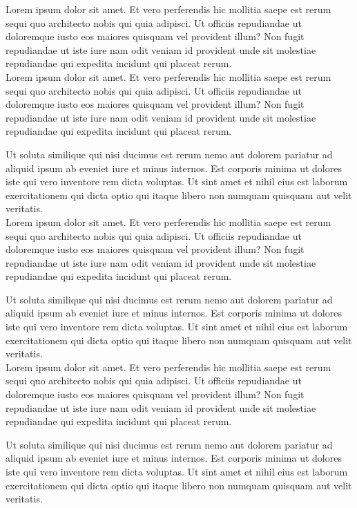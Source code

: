 \documentclass[12pt]{article}
\begin{document}
Lorem ipsum dolor sit amet. Et vero perferendis hic mollitia saepe est rerum sequi quo architecto nobis qui quia adipisci. Ut officiis repudiandae ut doloremque iusto eos maiores quisquam vel provident illum? Non fugit repudiandae ut iste iure nam odit veniam id provident unde sit molestiae repudiandae qui expedita incidunt qui placeat rerum.\\

\noindent Lorem ipsum dolor sit amet. Et vero perferendis hic mollitia saepe est rerum sequi quo architecto nobis qui quia adipisci. Ut officiis repudiandae ut doloremque iusto eos maiores quisquam vel provident illum? Non fugit repudiandae ut iste iure nam odit veniam id provident unde sit molestiae repudiandae qui expedita incidunt qui placeat rerum.

Ut soluta similique qui nisi ducimus est rerum nemo aut dolorem pariatur ad aliquid ipsum ab eveniet iure et minus internos. Est corporis minima ut dolores iste qui vero inventore rem dicta voluptas. Ut sint amet et nihil eius est laborum exercitationem qui dicta optio qui itaque libero non numquam quisquam aut velit veritatis.\\

\noindent Lorem ipsum dolor sit amet. Et vero perferendis hic mollitia saepe est rerum sequi quo architecto nobis qui quia adipisci. Ut officiis repudiandae ut doloremque iusto eos maiores quisquam vel provident illum? Non fugit repudiandae ut iste iure nam odit veniam id provident unde sit molestiae repudiandae qui expedita incidunt qui placeat rerum.

Ut soluta similique qui nisi ducimus est rerum nemo aut dolorem pariatur ad aliquid ipsum ab eveniet iure et minus internos. Est corporis minima ut dolores iste qui vero inventore rem dicta voluptas. Ut sint amet et nihil eius est laborum exercitationem qui dicta optio qui itaque libero non numquam quisquam aut velit veritatis.\\

\noindent Lorem ipsum dolor sit amet. Et vero perferendis hic mollitia saepe est rerum sequi quo architecto nobis qui quia adipisci. Ut officiis repudiandae ut doloremque iusto eos maiores quisquam vel provident illum? Non fugit repudiandae ut iste iure nam odit veniam id provident unde sit molestiae repudiandae qui expedita incidunt qui placeat rerum.

Ut soluta similique qui nisi ducimus est rerum nemo aut dolorem pariatur ad aliquid ipsum ab eveniet iure et minus internos. Est corporis minima ut dolores iste qui vero inventore rem dicta voluptas. Ut sint amet et nihil eius est laborum exercitationem qui dicta optio qui itaque libero non numquam quisquam aut velit veritatis.\\
\end{document}
